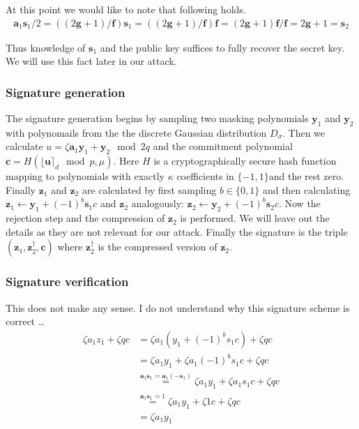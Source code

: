 \documentclass[a4paper,titlepage]{article}
\begin{document}
At this point we would like to note that following holds.
\begin{align}
	\bm{a}_{1}\bm{s}_{1} / 2 = ((2\bm{g}+1) / \bm{f})  \bm{s}_{1} =  ((2\bm{g}+1) / \bm{f})  \bm{f} = (2\bm{g}+1) \bm{f}/\bm{f} = 2\bm{g}+1 = \bm{s}_{2}
\end{align}

Thus knowledge of $\bm{s}_{1}$ and the public key suffices to fully recover the secret key. We will use this fact later in our attack.

\subsubsection{Signature generation}
The signature generation begins by sampling two masking polynomials $\bm{y}_{1}$ and $\bm{y}_{2}$ with polynomails from the the discrete Gaussian distribution $D_{\sigma}$.
Then we calculate $u = \zeta \bm{a}_{1} \bm{y}_{1} + \bm{y}_{2} \mod 2q$ and the commitment polynomial $\bm{c} = H({\lfloor \bm{u} \rceil}_{d} \mod p, \mu)$.
Here $H$ is a cryptographically secure hash function mapping to polynomials with exactly $\kappa$ coefficients in $\{-1, 1\}$and the rest zero.
Finally $\bm{z}_{1}$ and $\bm{z}_{2}$ are calculated by first sampling $b \in \{0,1\}$ and then calculating $\bm{z}_{1} \leftarrow \bm{y}_{1} + (-1)^{b} \bm{s}_{1}c$ and $\bm{z}_{2}$ analogously:  $\bm{z}_{2} \leftarrow \bm{y}_{2} + (-1)^{b} \bm{s}_{2}c$.
Now the rejection step and the compression of $\bm{z}_{2}$ is performed. We will leave out the details as they are not relevant for our attack.
Finally the signature is the triple $(\bm{z}_{1}, \bm{z}^{\dagger}_{2}, \bm{c})$ where $\bm{z}^{\dagger}_{2}$ is the compressed version of $\bm{z}_{2}$.

\subsubsection{Signature verification}
This does not make any sense. I do not understand why this signature scheme is correct \ldots
\begin{align}
	\zeta a_{1} z_{1} + \zeta q c &= \zeta a_{1} (y_{1} + (-1)^{b} s_{1}c) + \zeta q c \\
	&=  \zeta a_{1} y_{1} +  \zeta a_{1} (-1)^{b} s_{1}c + \zeta q c \\
	&\overset{\bm{a}_{1} \bm{s}_{1} = \bm{a}_{1} (- \bm{s}_{1})}{=}   \zeta a_{1} y_{1}+  \zeta a_{1} s_{1}c + \zeta q c \\
	&\overset{\bm{a}_{1} \bm{s}_{1} = 1}{=}   \zeta a_{1} y_{1}+  \zeta 1 c + \zeta q c \\
	&=   \zeta a_{1} y_{1}
\end{align}
\end{document}
